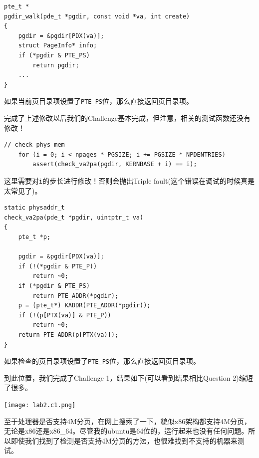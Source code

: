 \documentclass[11pt]{article}
\begin{document}
\begin{lstlisting}[title=pgdir\_walk()]
pte_t *
pgdir_walk(pde_t *pgdir, const void *va, int create)
{
	pgdir = &pgdir[PDX(va)];
	struct PageInfo* info;
	if (*pgdir & PTE_PS)
		return pgdir;
    ...
}
\end{lstlisting}
如果当前页目录项设置了\lstinline|PTE_PS|位，那么直接返回页目录项。

完成了上述修改以后我们的Challenge基本完成，但注意，相关的测试函数还没有修改！

\begin{lstlisting}[title=check\_kern\_pgdir()]
	// check phys mem
	for (i = 0; i < npages * PGSIZE; i += PGSIZE * NPDENTRIES)
		assert(check_va2pa(pgdir, KERNBASE + i) == i);
\end{lstlisting}
这里需要对\lstinline|i|的步长进行修改！否则会抛出Triple fault(这个错误在调试的时候真是太常见了)。

\begin{lstlisting}[title=check\_va2pa()]
static physaddr_t
check_va2pa(pde_t *pgdir, uintptr_t va)
{
	pte_t *p;

	pgdir = &pgdir[PDX(va)];
	if (!(*pgdir & PTE_P))
		return ~0;
	if (*pgdir & PTE_PS)
		return PTE_ADDR(*pgdir);
	p = (pte_t*) KADDR(PTE_ADDR(*pgdir));
	if (!(p[PTX(va)] & PTE_P))
		return ~0;
	return PTE_ADDR(p[PTX(va)]);
}
\end{lstlisting}
如果检查的页目录项设置了\lstinline|PTE_PS|位，那么直接返回页目录项。

到此位置，我们完成了Challenge 1，结果如下(可以看到结果相比Question 2)缩短了很多。

\begin{center}
\texttt{[image: lab2.c1.png]}
\end{center}

至于处理器是否支持4M分页，在网上搜索了一下，貌似x86架构都支持4M分页，无论是x86还是x86\_64。尽管我的ubuntu是64位的，运行起来也没有任何问题。所以即使我们找到了检测是否支持4M分页的方法，也很难找到不支持的机器来测试。
\end{document}
